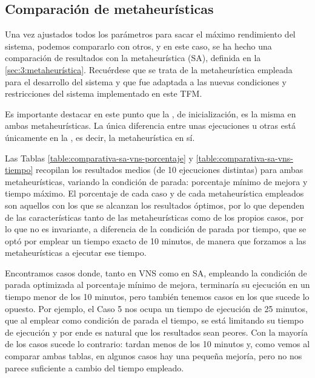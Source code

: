 \subsection{Comparación de metaheurísticas}
\label{sec:5:comparacion-metaheuristicas}

Una vez ajustados todos los parámetros para sacar el máximo rendimiento del sistema, podemos compararlo con otros, y en este caso, se ha hecho una comparación de resultados con la metaheurística \sa{} (SA), definida en la \autoref{sec:3:metaheurística}. Recuérdese que se trata de la metaheurística empleada para el desarrollo del sistema \legacy{} y que fue adaptada a las nuevas condiciones y restricciones del sistema implementado en este TFM.

Es importante destacar en este punto que la \faseuno{}, de inicialización, es la misma en ambas metaheurísticas. La única diferencia entre unas ejecuciones u otras está únicamente en la \fasedos{}, es decir, la metaheurística en sí.

Las Tablas \ref{table:comparativa-sa-vns-porcentaje} y \ref{table:comparativa-sa-vns-tiempo} recopilan los resultados medios (de 10 ejecuciones distintas) para ambas metaheurísticas, variando la condición de parada: porcentaje mínimo de mejora y tiempo máximo. El porcentaje de cada caso y de cada metaheurística empleados son aquellos con los que se alcanzan los resultados óptimos, por lo que dependen de las características tanto de las metaheurísticas como de los propios casos, por lo que no es invariante, a diferencia de la condición de parada por tiempo, que se optó por emplear un tiempo exacto de 10 minutos, de manera que forzamos a las metaheurísticas a ejecutar ese tiempo. 

Encontramos casos donde, tanto en VNS como en SA, empleando la condición de parada optimizada al porcentaje mínimo de mejora, terminaría su ejecución en un tiempo menor de los 10 minutos, pero también tenemos casos en los que sucede lo opuesto. Por ejemplo, el Caso 5 nos ocupa un tiempo de ejecución de 25 minutos, que al emplear como condición de parada el tiempo, se está limitando su tiempo de ejecución y por ende es natural que los resultados sean peores. Con la mayoría de los casos sucede lo contrario: tardan menos de los 10 minutos y, como vemos al comparar ambas tablas, en algunos casos hay una pequeña mejoría, pero no nos parece suficiente a cambio del tiempo empleado.


